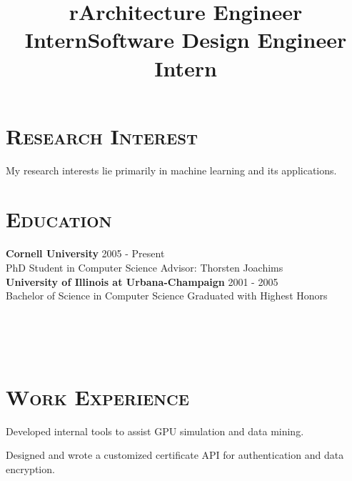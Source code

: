 \begin{resume}




\section{\textsc{Research Interest}}
My research interests lie primarily in machine learning and its applications.

\section{\textsc{Education}}

\textbf{Cornell University} \hfill 2005 - Present \\
PhD Student in Computer Science \hfill Advisor: Thorsten Joachims \\
\newline
\textbf{University of Illinois at Urbana-Champaign} \hfill 2001 - 2005 \\ 
Bachelor of Science in Computer Science \hfill Graduated with Highest Honors




\begin{formatb}
  \title{r}\\
  \\
  \body\\
\end{formatb}

\section{\textsc{Work Experience}}

\title{Architecture Engineer Intern}
\begin{position}
Developed internal tools to assist GPU simulation and data mining.
\end{position}

\title{Software Design Engineer Intern}
\begin{position}
Designed and wrote a customized certificate API for authentication and data encryption.
\end{position}


\end{resume}
